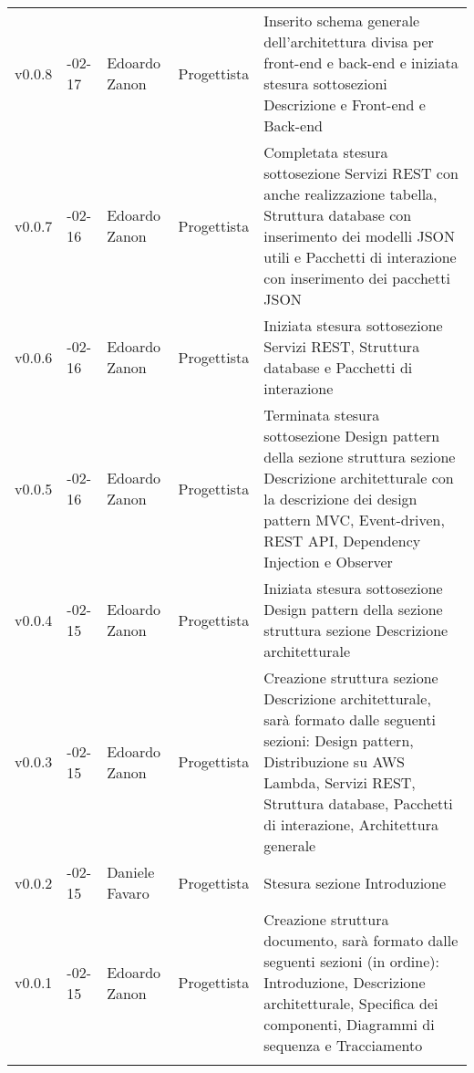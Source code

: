 \begin{longtable} { >{\centering}p{1.4cm} >{\centering}p{2cm} >{\centering}p{2.3cm} >{\centering}p{2.7cm} p{5.5cm} }
	\addlinespace[0.4em]
	\midrule
	\addlinespace[0.4em]
	v0.0.8 & 2017-02-17 &  Edoardo Zanon & Progettista & Inserito schema generale dell'architettura divisa per front-end e back-end e iniziata stesura sottosezioni Descrizione e Front-end e Back-end \\
	\addlinespace[0.4em]
	\midrule
	\addlinespace[0.4em]
	v0.0.7 & 2017-02-16 &  Edoardo Zanon & Progettista & Completata stesura sottosezione Servizi REST con anche realizzazione tabella, Struttura database con inserimento dei modelli JSON utili e Pacchetti di interazione con inserimento dei pacchetti JSON \\
	\addlinespace[0.4em]
	\midrule
	\addlinespace[0.4em]
	v0.0.6 & 2017-02-16 &  Edoardo Zanon & Progettista & Iniziata stesura sottosezione Servizi REST, Struttura database e Pacchetti di interazione  \\
	\addlinespace[0.4em]
	\midrule
	\addlinespace[0.4em]
	v0.0.5 & 2017-02-16 &  Edoardo Zanon & Progettista & Terminata stesura sottosezione Design pattern della sezione struttura sezione Descrizione architetturale con la descrizione dei design pattern MVC, Event-driven, REST API, Dependency Injection e Observer  \\
	\addlinespace[0.4em]
	\midrule
	\addlinespace[0.4em]
	v0.0.4 & 2017-02-15 &  Edoardo Zanon & Progettista & Iniziata stesura sottosezione Design pattern della sezione struttura sezione Descrizione architetturale  \\
	\addlinespace[0.4em]
	\midrule
	\addlinespace[0.4em]
	v0.0.3 & 2017-02-15 &  Edoardo Zanon & Progettista & Creazione struttura sezione Descrizione architetturale, sarà formato dalle seguenti sezioni: Design pattern, Distribuzione su AWS Lambda, Servizi REST, Struttura database, Pacchetti di interazione, Architettura generale  \\
	\addlinespace[0.4em]
	\midrule
	\addlinespace[0.4em]
	v0.0.2 & 2017-02-15 &  Daniele Favaro & Progettista & Stesura sezione Introduzione  \\
	\addlinespace[0.4em]
	\midrule
	\addlinespace[0.4em]
	v0.0.1 & 2017-02-15 &  Edoardo Zanon & Progettista & Creazione struttura documento, sarà formato dalle seguenti sezioni (in ordine): Introduzione, Descrizione architetturale, Specifica dei componenti, Diagrammi di sequenza e Tracciamento  \\
	\arrayrulecolor{black}
	\addlinespace[0.5em]
	\bottomrule
\end{longtable}
